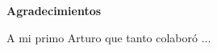 \vspace*{\fill}
\begin{center}
	\textbf{Agradecimientos} 
\end{center}

A mi primo Arturo que tanto colaboró ...

\vspace*{\fill}
